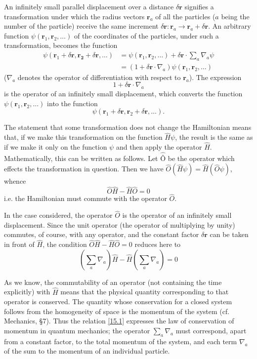 An infinitely small parallel displacement over a distance $ \delta \bm{r} $ signifies a transformation under which the radius vectors $ \bm{r}_a $ of all the particles ($ a $ being the number of the particle) receive the same increment $ \delta\bm{r}: \bm{r}_a \rightarrow \bm{r}_a + \delta\bm{r} $. An arbitrary function $ \psi(\bm{r}_1, \bm{r}_2,\dots) $ of the coordinates of the particles, under such a transformation, becomes the function
\begin{align*}
\psi(\bm{r}_1+\delta\bm{r},\bm{r_2}+\delta\bm{r},\dots)&=\psi(\bm{r}_1,\bm{r}_2,\dots)+\delta\bm{r}\cdot\sum_{a}\nabla_a\psi\\
&=(1+\delta\bm{r}\cdot\nabla_a)\psi(\bm{r}_1,\bm{r}_2,\dots)
\end{align*}
($ \nabla_a $ denotes the operator of differentiation with respect to $ \bm{r}_a $). The expression
\[ 1+\delta\bm{r}\cdot\nabla_a \]
is the operator of an infinitely small displacement, which converts the function $ \psi(\bm{r}_1, \bm{r}_2,\dots) $ into the function
\[ \psi(\bm{r}_1+\delta\bm{r},\bm{r}_2+\delta\bm{r},\dots). \]

The statement that some transformation does not change the Hamiltonian means that, if we make this transformation on the function $ \hat{H}\psi $, the result is the same as if we make it only on the function $\psi$ and then apply the operator $\hat{H}$. Mathematically, this can be written as follows. Let $\hat{Ô}$ be the operator which effects the transformation in question. Then we have $ \hat{O}(\hat{H}\psi)=\hat{H}(\hat{O}\psi) $, whence
\[ \hat{O}\hat{H}-\hat{H}\hat{O}=0 \]
i.e. the Hamiltonian must commute with the operator $\hat{O}$.

In the case considered, the operator $\hat{O}$ is the operator of an infinitely small displacement. Since the unit operator (the operator of multiplying by unity) commutes, of course, with any operator, and the constant factor $ \delta\bm{r} $ can be taken in front of $\hat{H}$, the condition $ \hat{O}\hat{H}-\hat{H}\hat{O}=0 $ reduces here to
\begin{equation}\label{15.1}
\left(\sum_a\nabla_a \right)\hat{H}-\hat{H}\left(\sum_a\nabla_a \right)=0
\end{equation}


As we know, the commutability of an operator (not containing the time explicitly) with $\hat{H}$ means that the physical quantity corresponding to that operator is conserved. The quantity whose conservation for a closed system follows from the homogeneity of space is the momentum of the system (cf. Mechanics, \S7). Thus the relation \eqref{15.1} expresses the law of conservation of momentum in quantum mechanics; the operator $ \sum_a\nabla_a $ must correspond, apart from a constant factor, to the total momentum of the system, and each term $ \nabla_a $ of the sum to the momentum of an individual particle.

